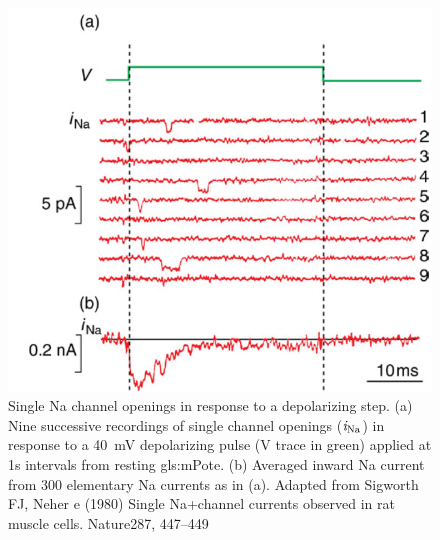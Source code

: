 \documentclass[class={myRUCProject}, crop=false]{standalone}
\begin{document}
\begin{figure}[H]
  \centering
  \includegraphics[width=0.5\linewidth]{Pictures//Anakin/iNa.png}
  \caption{Single \gls{Na} channel openings in response to a depolarizing step. (a) Nine successive recordings of single channel openings (\(\mathit{i}_\mathrm{Na}\)) in response to a \qty{ 40}{\mV} depolarizing pulse (V trace in green) applied at 1s intervals from resting \gls{gls:mPote}. (b) Averaged inward \gls{Na} current from 300 elementary \gls{Na} currents as in (a). Adapted from Sigworth FJ, Neher e (1980) Single Na+channel currents observed in rat muscle cells. Nature287, 447–449 }
  \label{fig:unitcurNa}
\end{figure}
\end{document}
